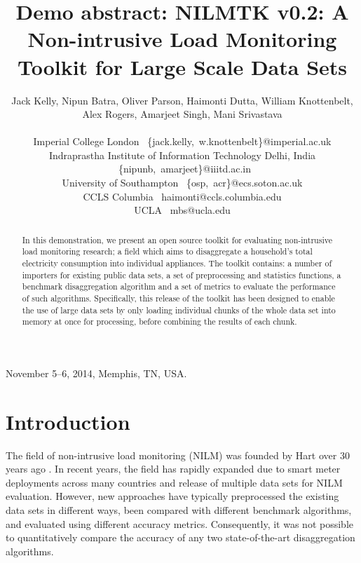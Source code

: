 \documentclass[10pt,abstract]{sensys-proc}
\begin{document}
\title{Demo abstract: NILMTK v0.2: A Non-intrusive Load Monitoring Toolkit for Large Scale Data Sets}


 \author{Jack Kelly, Nipun Batra, Oliver Parson, Haimonti Dutta, William Knottenbelt,\\ Alex Rogers, Amarjeet Singh, Mani Srivastava\\ \\
\small  Imperial College London ~\{jack.kelly,~w.knottenbelt\}@imperial.ac.uk\\
\small Indraprastha Institute of Information Technology Delhi, India ~\{nipunb,~amarjeet\}@iiitd.ac.in\\
\small  University of Southampton ~\{osp,~acr\}@ecs.soton.ac.uk\\
\small  CCLS Columbia ~haimonti@ccls.columbia.edu\\
\small  UCLA ~mbs@ucla.edu\\
}

 {November 5--6, 2014, Memphis, TN, USA.}



\maketitle

\begin{abstract}
In this demonstration, we present an open source toolkit for evaluating non-intrusive load monitoring research; a field which aims to disaggregate a household's total electricity consumption into individual appliances. The toolkit contains: a number of importers for existing public data sets, a set of preprocessing and statistics functions, a benchmark disaggregation algorithm and a set of metrics to evaluate the performance of such algorithms. Specifically, this release of the toolkit has been designed to enable the use of large data sets by only loading individual chunks of the whole data set into memory at once for processing, before combining the results of each chunk.
\end{abstract}





\section{Introduction}

The field of non-intrusive load monitoring (NILM) was founded by Hart over 30 years ago \cite{hart_1992}. In recent years, the field has rapidly expanded due to smart meter deployments across many countries and release of multiple data sets for NILM evaluation. However, new approaches have typically preprocessed the existing data sets in different ways, been compared with different benchmark algorithms, and evaluated using different accuracy metrics. Consequently, it was not possible to quantitatively compare the accuracy of any two state-of-the-art disaggregation algorithms.
\end{document}
